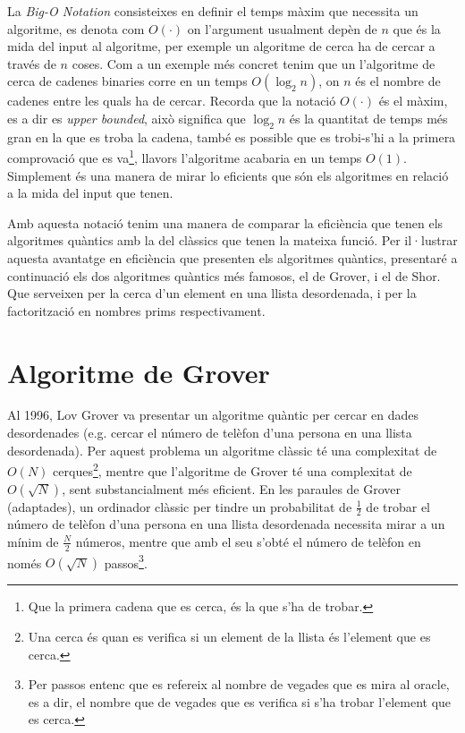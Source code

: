 La \textit{Big-O Notation} consisteixes en definir el temps màxim que necessita un algoritme, es denota com $O(\cdot)$ on l'argument usualment depèn de $n$ que és la mida del input al algoritme, per exemple un algoritme de cerca ha de cercar a través de $n$ coses. Com a un exemple més concret tenim que un l'algoritme de cerca de cadenes binaries corre en un temps $O(\log_{2} n)$, on $n$ és el nombre de cadenes entre les quals ha de cercar. Recorda que la notació $O(\cdot)$ és el màxim, es a dir es \textit{upper bounded}, això significa que $\log_{2} n$ és la quantitat de temps més gran en la que es troba la cadena, també es possible que es trobi-s'hi a la primera comprovació que es va\footnote{Que la primera cadena que es cerca, és la que s'ha de trobar.}, llavors l'algoritme acabaria en un temps $O(1)$. Simplement és una manera de mirar lo eficients que són els algoritmes en relació a la mida del input que tenen.

Amb aquesta notació tenim una manera de comparar la eficiència que tenen els algoritmes quàntics amb la del clàssics que tenen la mateixa funció. Per il·lustrar aquesta avantatge en eficiència que presenten els algoritmes quàntics, presentaré a continuació els dos algoritmes quàntics més famosos, el de Grover, i el de Shor. Que serveixen per la cerca d'un element en una llista desordenada, i per la factorització en nombres prims respectivament. 

\section{Algoritme de Grover}
Al 1996, Lov Grover va presentar un algoritme quàntic per cercar en dades desordenades \cite{Grover_96} (e.g. cercar el número de telèfon d'una persona en una llista desordenada). Per aquest problema un algoritme clàssic té una complexitat de $O(N)$ cerques\footnote{Una cerca és quan es verifica si un element de la llista és l'element que es cerca.}, mentre que l'algoritme de Grover té una complexitat de $O(\sqrt{N})$, sent substancialment més eficient. En les paraules de Grover \cite{Grover_96} (adaptades), un ordinador clàssic per tindre un probabilitat de $\frac{1}{2}$ de trobar el número de telèfon d'una persona en una llista desordenada necessita mirar a un mínim de $\frac{N}{2}$ números, mentre que amb el seu s'obté el número de telèfon en només $O(\sqrt{N})$ passos\footnote{Per passos entenc que es refereix al nombre de vegades que es mira al oracle, es a dir, el nombre que de vegades que es verifica si s'ha trobar l'element que es cerca.}.

